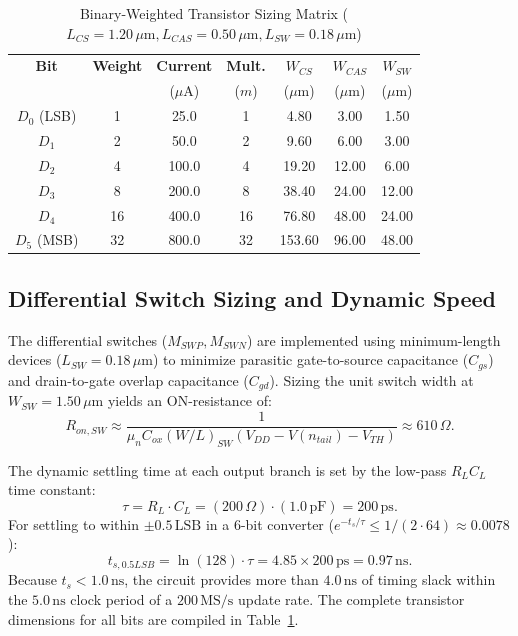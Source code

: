 \documentclass[conference,10pt]{IEEEtran}
\begin{document}
\begin{table}[t]
\centering
\caption{Binary-Weighted Transistor Sizing Matrix ($L_{CS} = 1.20\,\mu\text{m}, L_{CAS} = 0.50\,\mu\text{m}, L_{SW} = 0.18\,\mu\text{m}$)}
\label{tab:sizing}
\begin{tabular}{ccccccc}
\toprule
\textbf{Bit} & \textbf{Weight} & \textbf{Current} & \textbf{Mult.} & \textbf{$W_{CS}$} & \textbf{$W_{CAS}$} & \textbf{$W_{SW}$} \\
& & ($\mu\text{A}$) & ($m$) & ($\mu\text{m}$) & ($\mu\text{m}$) & ($\mu\text{m}$) \\
\midrule
$D_0$ (LSB) & 1 & 25.0 & 1 & 4.80 & 3.00 & 1.50 \\
$D_1$ & 2 & 50.0 & 2 & 9.60 & 6.00 & 3.00 \\
$D_2$ & 4 & 100.0 & 4 & 19.20 & 12.00 & 6.00 \\
$D_3$ & 8 & 200.0 & 8 & 38.40 & 24.00 & 12.00 \\
$D_4$ & 16 & 400.0 & 16 & 76.80 & 48.00 & 24.00 \\
$D_5$ (MSB) & 32 & 800.0 & 32 & 153.60 & 96.00 & 48.00 \\
\bottomrule
\end{tabular}
\end{table}

\subsection{Differential Switch Sizing and Dynamic Speed}
The differential switches ($M_{SWP}, M_{SWN}$) are implemented using minimum-length devices ($L_{SW} = 0.18\,\mu\text{m}$) to minimize parasitic gate-to-source capacitance ($C_{gs}$) and drain-to-gate overlap capacitance ($C_{gd}$). Sizing the unit switch width at $W_{SW} = 1.50\,\mu\text{m}$ yields an ON-resistance of:
\begin{equation}
R_{on,SW} \approx \frac{1}{\mu_n C_{ox} (W/L)_{SW} (V_{DD} - V(n_{tail}) - V_{TH})} \approx 610\,\Omega.
\end{equation}

The dynamic settling time at each output branch is set by the low-pass $R_L C_L$ time constant:
\begin{equation}
\tau = R_L \cdot C_L = (200\,\Omega) \cdot (1.0\,\text{pF}) = 200\,\text{ps}.
\end{equation}
For settling to within $\pm 0.5\,\text{LSB}$ in a 6-bit converter ($e^{-t_s/\tau} \le 1/(2 \cdot 64) \approx 0.0078$):
\begin{equation}
t_{s,0.5LSB} = \ln(128) \cdot \tau = 4.85 \times 200\,\text{ps} = 0.97\,\text{ns}.
\end{equation}
Because $t_{s} < 1.0\,\text{ns}$, the circuit provides more than $4.0\,\text{ns}$ of timing slack within the $5.0\,\text{ns}$ clock period of a $200\,\text{MS/s}$ update rate. The complete transistor dimensions for all bits are compiled in Table~\ref{tab:sizing}.
\end{document}
